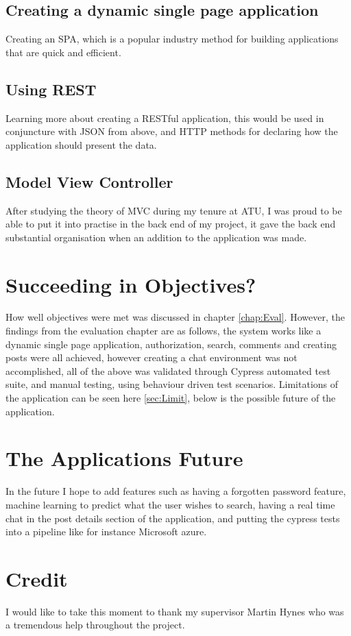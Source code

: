 \subsection{Creating a dynamic single page application}
Creating an SPA, which is a popular industry method for building applications that are quick and efficient.

\subsection{Using REST}
Learning more about creating a RESTful application, this would be used in conjuncture with JSON from above, and HTTP methods for declaring how the application should present the data.

\subsection{Model View Controller}
After studying the theory of MVC during my tenure at ATU, I was proud to be able to put it into practise in the back end of my project, it gave the back end substantial organisation when an addition to the application was made.

\section{Succeeding in Objectives?}
How well objectives were met was discussed in chapter \ref{chap:Eval}. However, the findings from the evaluation chapter are as follows, the system works like a dynamic single page application, authorization, search, comments and creating posts were all achieved, however creating a chat environment was not accomplished, all of the above was validated through Cypress automated test suite, and manual testing, using behaviour driven test scenarios. Limitations of the application can be seen here \ref{sec:Limit}, below is the possible future of the application.

\section{The Applications Future}
In the future I hope to add features such as having a forgotten password feature, machine learning to predict what the user wishes to search, having a real time chat in the post details section of the application, and putting the cypress tests into a pipeline like for instance Microsoft azure.

\section{Credit}
I would like to take this moment to thank my supervisor Martin Hynes who was a tremendous help throughout the project.
